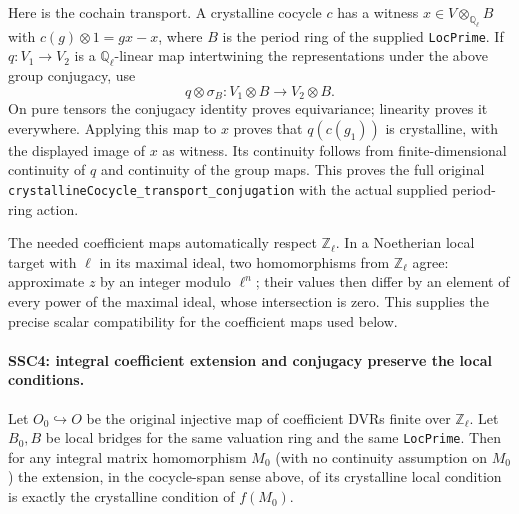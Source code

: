 \documentclass[11pt,a4paper]{article}
\numberwithin{equation}{section}
\theoremstyle{remark}\newtheorem{remark}[theorem]{Remark}
\begin{document}
Here is the cochain transport. A crystalline cocycle $c$ has a
witness $x\in V\otimes_{\mathbb Q_\ell}B$ with
$c(g)\otimes1=gx-x$, where $B$ is the period ring of the supplied
\texttt{Loc\allowbreak Prime}. If $q:V_1\to V_2$ is a
$\mathbb Q_\ell$-linear map intertwining the representations
under the above group conjugacy, use
\[
 q\otimes\sigma_B:V_1\otimes B\longrightarrow V_2\otimes B.
\]
On pure tensors the conjugacy identity proves equivariance;
linearity proves it everywhere. Applying this map to $x$ proves
that $q(c(g_1))$ is crystalline, with the displayed image of $x$
as witness. Its continuity follows from finite-dimensional
continuity of $q$ and continuity of the group maps. This proves
the full original \texttt{crystalline\allowbreak Cocycle\_\allowbreak transport\_\allowbreak conjugation}
with the actual supplied period-ring action.

The needed coefficient maps automatically respect
$\mathbb Z_\ell$. In a Noetherian local target with $\ell$ in its
maximal ideal, two homomorphisms from $\mathbb Z_\ell$ agree:
approximate $z$ by an integer modulo $\ell^n$; their values then
differ by an element of every power of the maximal ideal, whose
intersection is zero. This supplies the precise scalar compatibility
for the coefficient maps used below.

\paragraph{SSC4: integral coefficient extension and conjugacy preserve the local conditions.}
\label{claim:SSC4}
Let $O_0\hookrightarrow O$ be the original injective map of
coefficient DVRs finite over $\mathbb Z_\ell$. Let $B_0,B$ be
local bridges for the same valuation ring and the same
\texttt{Loc\allowbreak Prime}. Then for any integral matrix homomorphism $M_0$
(with no continuity assumption on $M_0$)
the extension, in the cocycle-span sense above, of its crystalline
local condition is exactly the crystalline condition of $f(M_0)$.
\end{document}
